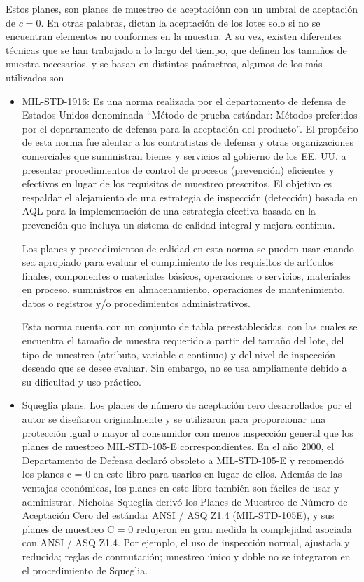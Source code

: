 Estos planes, son planes de muestreo de aceptaci\'{o}nn con un umbral de aceptaci\'{o}n de $c = 0$. En otras palabras, dictan la aceptaci\'{o}n de los lotes solo si no se encuentran elementos no conformes en la muestra. A su vez, existen diferentes t\'{e}cnicas que se han trabajado a lo largo del tiempo, que definen los tama\~{n}os de muestra necesarios, y se basan en distintos pa\'{a}metros, algunos de los m\'{a}s utilizados son
\begin{itemize}
\item MIL-STD-1916: Es una norma realizada por el departamento de defensa de Estados Unidos denominada ``M\'{e}todo de prueba est\'{a}ndar: M\'{e}todos preferidos por el departamento de defensa para la aceptaci\'{o}n del producto''. El prop\'{o}sito de esta norma fue alentar a los contratistas de defensa y otras organizaciones comerciales que suministran bienes y servicios al gobierno de los EE. UU. a presentar procedimientos de control de procesos (prevenci\'{o}n) eficientes y efectivos en lugar de los requisitos de muestreo prescritos. El objetivo es respaldar el alejamiento de una estrategia de inspecci\'{o}n (detecci\'{o}n) basada en AQL para la implementaci\'{o}n de una estrategia efectiva basada en la prevenci\'{o}n que incluya un sistema de calidad integral y mejora continua.

Los planes y procedimientos de calidad en esta norma se pueden usar cuando sea apropiado para evaluar el cumplimiento de los requisitos de art\'{i}culos finales, componentes o materiales b\'{a}sicos, operaciones o servicios, materiales en proceso, suministros en almacenamiento, operaciones de mantenimiento, datos o registros y/o procedimientos administrativos. 

Esta norma cuenta con un conjunto de tabla preestablecidas, con las cuales se encuentra el tama\~{n}o de muestra requerido a partir del tama\~{n}o del lote, del tipo de muestreo (atributo, variable o continuo) y del nivel de inspecci\'{o}n deseado  que se desee evaluar. Sin embargo, no se usa ampliamente debido a su dificultad y uso pr\'{a}ctico.


\item Squeglia plans: Los planes de n\'{u}mero de aceptaci\'{o}n cero desarrollados por el autor se dise\~{n}aron originalmente y se utilizaron para proporcionar una protecci\'{o}n igual o mayor al consumidor con menos inspecci\'{o}n general que los planes de muestreo MIL-STD-105-E correspondientes. En el a\~{n}o 2000, el Departamento de Defensa declar\'{o} obsoleto a MIL-STD-105-E y recomend\'{o} los planes c = 0 en este libro para usarlos en lugar de ellos. Adem\'{a}s de las ventajas econ\'{o}micas, los planes en este libro tambi\'{e}n son f\'{a}ciles de usar y administrar. Nicholas Squeglia deriv\'{o} los Planes de Muestreo de N\'{u}mero de Aceptaci\'{o}n Cero del est\'{a}ndar ANSI / ASQ Z1.4 (MIL-STD-105E), y sus planes de muestreo C = 0 redujeron en gran medida la complejidad asociada con ANSI / ASQ Z1.4. Por ejemplo, el uso de inspecci\'{o}n normal, ajustada y reducida; reglas de conmutaci\'{o}n; muestreo \'{u}nico y doble no se integraron en el procedimiento de Squeglia.
\end{itemize}




